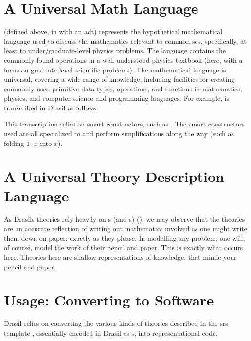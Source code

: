 \section{A Universal Math Language}
\label{sec:modelkinds:language}

\originalExprHaskell

\Expr{} (defined above, in  with an \acs{adt})
represents the hypothetical mathematical language used to discuss the
mathematics relevant to common \acs{scs}, specifically, at least to
under/graduate-level physics problems. The language contains the commonly found
operations in a well-understood physics textbook (here, with a focus on
graduate-level scientific problems). The mathematical language is universal,
covering a wide range of knowledge, including facilities for creating commonly
used primitive data types, operations, and functions  in mathematics, physics,
and computer science and programming languages. For example,  is transcribed in Drasil as follows:


This transcription relies on smart constructors, such as . The smart constructors used are
all specialized to \Expr{} and perform simplifications along the way (such
as folding \(1 \cdot x\) into \(x\)).

\section{A Universal Theory Description Language}

As Drasils theories rely heavily on \Relation{}s (and \RelationConcept{}s)
(), we may observe that the
theories are an accurate reflection of writing out mathematics involved as one
might write them down on paper: exactly as they please. In modelling any
problem, one will, of course, model the work of their pencil and paper. This is
exactly what occurs here. Theories here are shallow representations of
knowledge, that mimic your pencil and paper.

\section{Usage: Converting to Software}

Drasil relies on converting the various kinds of theories described in the
\acs{srs} template \cite{SmithAndLai2005}, essentially encoded in Drasil as
\RelationConcept{}s, into representational code.

